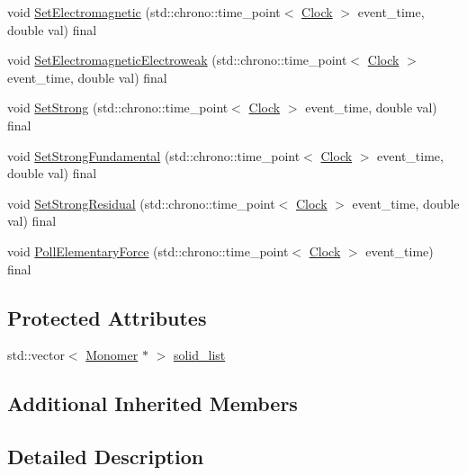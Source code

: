 \begin{DoxyCompactItemize}
\item 
void \hyperlink{class_monomer_a50e41be601b31450a97bfd15950cfb3d}{Set\+Electromagnetic} (std\+::chrono\+::time\+\_\+point$<$ \hyperlink{universe_8h_a0ef8d951d1ca5ab3cfaf7ab4c7a6fd80}{Clock} $>$ event\+\_\+time, double val) final
\item 
void \hyperlink{class_monomer_aa034728b74053ed3df452ddc8f1b46e8}{Set\+Electromagnetic\+Electroweak} (std\+::chrono\+::time\+\_\+point$<$ \hyperlink{universe_8h_a0ef8d951d1ca5ab3cfaf7ab4c7a6fd80}{Clock} $>$ event\+\_\+time, double val) final
\item 
void \hyperlink{class_monomer_a10b864f6bcad43f11a2316dbbe4c4742}{Set\+Strong} (std\+::chrono\+::time\+\_\+point$<$ \hyperlink{universe_8h_a0ef8d951d1ca5ab3cfaf7ab4c7a6fd80}{Clock} $>$ event\+\_\+time, double val) final
\item 
void \hyperlink{class_monomer_ad9df06c1a8264bfdb514ef3ba04ef4c7}{Set\+Strong\+Fundamental} (std\+::chrono\+::time\+\_\+point$<$ \hyperlink{universe_8h_a0ef8d951d1ca5ab3cfaf7ab4c7a6fd80}{Clock} $>$ event\+\_\+time, double val) final
\item 
void \hyperlink{class_monomer_ae6ca57913da27fa749d33d1c4fed27ca}{Set\+Strong\+Residual} (std\+::chrono\+::time\+\_\+point$<$ \hyperlink{universe_8h_a0ef8d951d1ca5ab3cfaf7ab4c7a6fd80}{Clock} $>$ event\+\_\+time, double val) final
\item 
void \hyperlink{class_monomer_a5b2375df1e19abdf6045c475d2ac23ca}{Poll\+Elementary\+Force} (std\+::chrono\+::time\+\_\+point$<$ \hyperlink{universe_8h_a0ef8d951d1ca5ab3cfaf7ab4c7a6fd80}{Clock} $>$ event\+\_\+time) final
\end{DoxyCompactItemize}
\subsection*{Protected Attributes}
\begin{DoxyCompactItemize}
\item 
std\+::vector$<$ \hyperlink{class_monomer}{Monomer} $\ast$ $>$ \hyperlink{class_monomer_ad792aeb859c72edbb17414bf00b8fd12}{solid\+\_\+list}
\end{DoxyCompactItemize}
\subsection*{Additional Inherited Members}


\subsection{Detailed Description}


